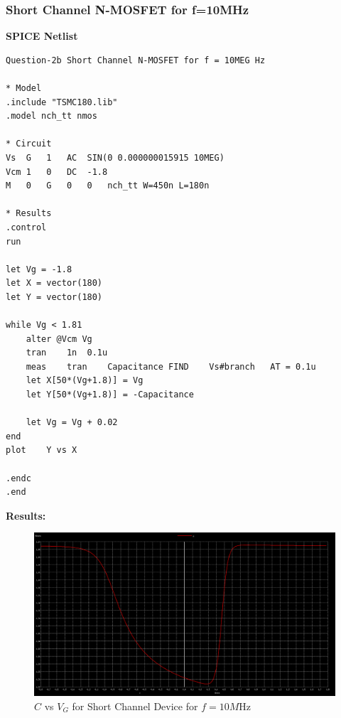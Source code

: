\documentclass{article}
\begin{document}
\subsubsection{Short Channel N-MOSFET for f=10MHz}
\textbf{SPICE Netlist}
\begin{lstlisting}
Question-2b Short Channel N-MOSFET for f = 10MEG Hz

* Model
.include "TSMC180.lib"
.model nch_tt nmos

* Circuit
Vs	G	1	AC	SIN(0 0.000000015915 10MEG)
Vcm	1	0	DC	-1.8
M	0	G	0	0	nch_tt W=450n L=180n

* Results
.control
run

let Vg = -1.8
let X = vector(180)
let Y = vector(180)

while Vg < 1.81
	alter @Vcm Vg
	tran	1n	0.1u		
	meas	tran	Capacitance	FIND	Vs#branch	AT = 0.1u
	let X[50*(Vg+1.8)] = Vg
	let Y[50*(Vg+1.8)] = -Capacitance

	let Vg = Vg + 0.02
end
plot	Y vs X

.endc
.end
\end{lstlisting}
\textbf{Results:}
\begin{figure}[!ht]
    \centering
    \includegraphics[scale=0.24]{Images/2bshort1.png}
    \caption{$C$ vs $V_G$ for Short Channel Device for $f=10M$Hz}
\end{figure}
\end{document}
